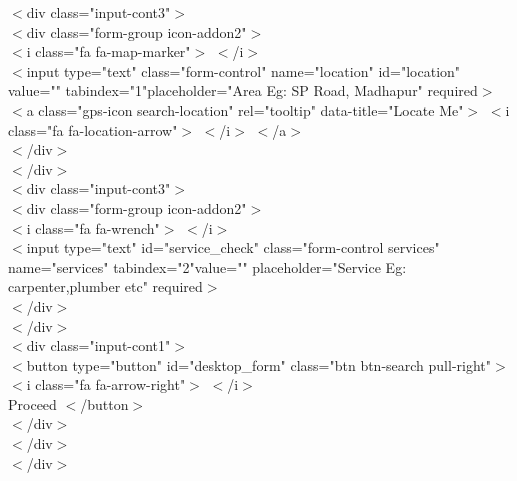 \documentclass[12pt,a4paper]{report}
\begin{document}
\begin{titlepage}
{                        $<$div class="input-cont3"$>$\\
                            $<$div class="form-group icon-addon2"$>$\\
                                $<$i class="fa fa-map-marker"$>$ $<$/i$>$\\
                                $<$input type="text" class="form-control" name="location" id="location"
                                       value="" tabindex="1"placeholder="Area Eg: SP Road, Madhapur"
                                       required$>$\\
                                $<$a class="gps-icon search-location" rel="tooltip" data-title="Locate Me"$>$ $<$i
 class="fa fa-location-arrow"$>$ $<$/i$>$ $<$/a$>$\\
                            $<$/div$>$\\
                        $<$/div$>$\\

                        $<$div class="input-cont3"$>$\\
                            $<$div class="form-group icon-addon2"$>$\\
                                $<$i class="fa fa-wrench"$>$ $<$/i$>$\\
                                $<$input type="text" id="service\_check" class="form-control  services"
                                       name="services" tabindex="2"value="" placeholder="Service Eg: carpenter,plumber etc" required$>$\\
                            $<$/div$>$\\
                        $<$/div$>$\\
                        $<$div class="input-cont1"$>$\\
                            $<$button type="button" id="desktop\_form" class="btn btn-search pull-right"$>$ $<$i class="fa fa-arrow-right"$>$ $<$/i$>$\\ Proceed
                            $<$/button$>$\\
                        $<$/div$>$\\
                    $<$/div$>$\\
                $<$/div$>$\\

}
\end{titlepage}
\end{document}
